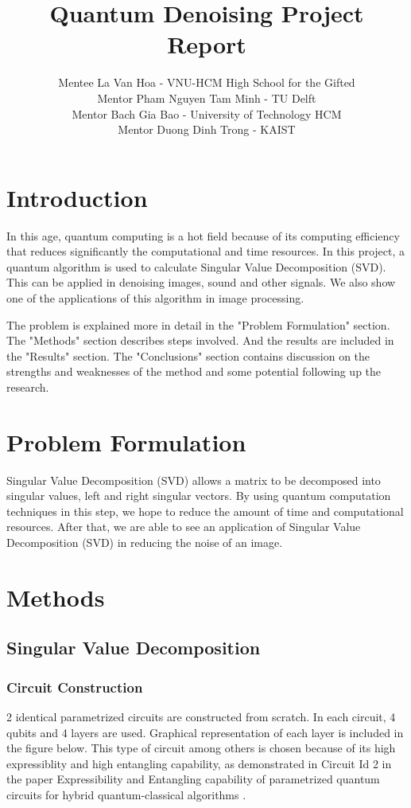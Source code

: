 \documentclass{article}
\title{Quantum Denoising Project Report }
\author{Mentee La Van Hoa - VNU-HCM High School for the Gifted \\
Mentor Pham Nguyen Tam Minh - TU Delft \\
Mentor Bach Gia Bao - University of Technology HCM\\
Mentor Duong Dinh Trong - KAIST}
\begin{document}
\maketitle


\section{Introduction}
In this age, quantum computing is a hot field because of its computing efficiency that reduces significantly the computational and time resources. In this project, a quantum algorithm  is used to calculate Singular Value Decomposition (SVD). This can be applied in denoising images, sound and other signals. We also show one of the  applications of this algorithm in image processing.

The problem is explained more in detail in the "Problem Formulation" section. The "Methods" section describes steps involved. And the results are included in the "Results" section. The "Conclusions" section contains discussion on the strengths and weaknesses of the method and some potential following up the research. 

\section{Problem Formulation}
Singular Value Decomposition (SVD) allows a matrix to be decomposed into singular values, left and right singular vectors. By using quantum computation techniques in this step, we hope to reduce the amount of time and computational resources. After that, we are able to see an application of  Singular Value Decomposition (SVD)  in reducing the noise of an image. 

\section {Methods}
\subsection{Singular Value Decomposition}
\subsubsection{Circuit Construction}
2 identical parametrized circuits are constructed from scratch. In each circuit, 4 qubits and 4 layers are used. Graphical representation of each layer is included in the figure below. This type of circuit among others is chosen because of its high expressiblity and high entangling capability, as demonstrated in Circuit Id 2 in the paper Expressibility and Entangling capability of parametrized quantum circuits for hybrid quantum-classical algorithms \cite{Sim_2019}.


\end{document}
